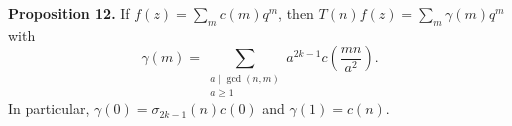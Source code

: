 \textbf{Proposition 12.} If $f(z) = \sum_{m} c(m) q^m$, then $T(n)f(z) = \sum_{m} \gamma(m) q^m$ with
$$\gamma(m) = \sum_{\substack{a \mid \gcd(n,m) \\ a \geq 1}} a^{2k-1} c\left(\frac{mn}{a^2}\right).$$
In particular, $\gamma(0) = \sigma_{2k-1}(n) c(0)$ and $\gamma(1) = c(n)$.
